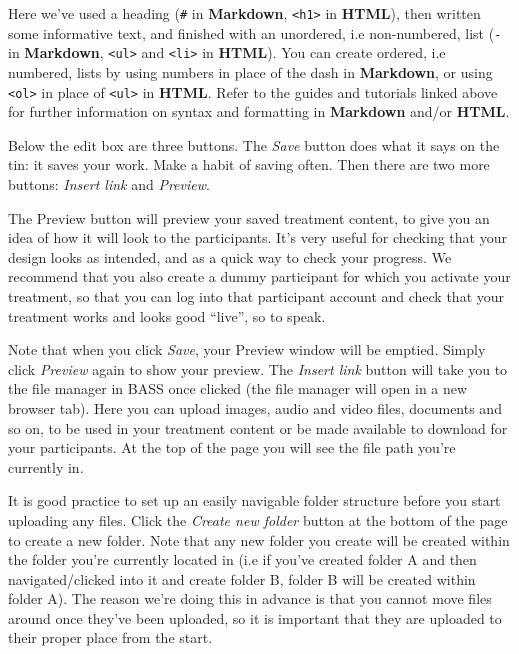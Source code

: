 \documentclass[
]{book}
\begin{document}
Here we've used a heading (\texttt{\#} in \textbf{Markdown}, \texttt{\textless{}h1\textgreater{}} in \textbf{HTML}), then written some informative text, and finished with an unordered, i.e non-numbered, list (\texttt{-} in \textbf{Markdown}, \texttt{\textless{}ul\textgreater{}} and \texttt{\textless{}li\textgreater{}} in \textbf{HTML}). You can create ordered, i.e numbered, lists by using numbers in place of the dash in \textbf{Markdown}, or using \texttt{\textless{}ol\textgreater{}} in place of \texttt{\textless{}ul\textgreater{}} in \textbf{HTML}. Refer to the guides and tutorials linked above for further information on syntax and formatting in \textbf{Markdown} and/or \textbf{HTML}.

Below the edit box are three buttons. The \emph{Save} button does what it says on the tin: it saves your work. Make a habit of saving often.
Then there are two more buttons: \emph{Insert link} and \emph{Preview}.

The Preview button will preview your saved treatment content, to give you an idea of how it will look to the participants. It's very useful for checking that your design looks as intended, and as a quick way to check your progress. We recommend that you also create a dummy participant for which you activate your treatment, so that you can log into that participant account and check that your treatment works and looks good ``live'', so to speak.

Note that when you click \emph{Save}, your Preview window will be emptied. Simply click \emph{Preview} again to show your preview.
The \emph{Insert link} button will take you to the file manager in BASS once clicked (the file manager will open in a new browser tab). Here you can upload images, audio and video files, documents and so on, to be used in your treatment content or be made available to download for your participants. At the top of the page you will see the file path you're currently in.

It is good practice to set up an easily navigable folder structure before you start uploading any files. Click the \emph{Create new folder} button at the bottom of the page to create a new folder. Note that any new folder you create will be created within the folder you're currently located in (i.e if you've created folder A and then navigated/clicked into it and create folder B, folder B will be created within folder A). The reason we're doing this in advance is that you cannot move files around once they've been uploaded, so it is important that they are uploaded to their proper place from the start.
\end{document}
